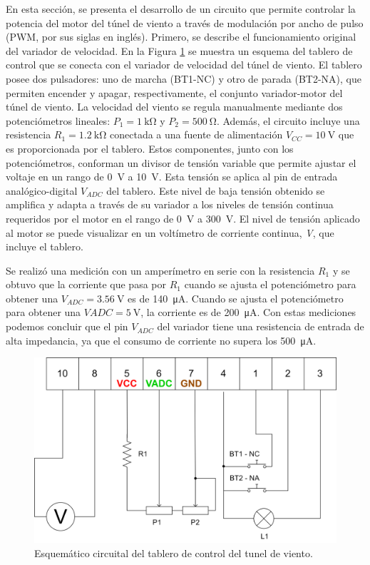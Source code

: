 En esta sección, se presenta el desarrollo de un circuito que permite controlar la potencia del motor del túnel de viento a través de modulación por ancho de pulso (PWM, por sus siglas en inglés). Primero, se describe el funcionamiento original del variador de velocidad. En la Figura \ref{fig:esquemCircuitoControlTunel} se muestra un esquema del tablero de control que se conecta con el variador de velocidad del túnel de viento. El tablero posee dos pulsadores: uno de marcha (BT1-NC) y otro de parada (BT2-NA), que permiten encender y apagar, respectivamente, el conjunto variador-motor del túnel de viento. La velocidad del viento se regula manualmente mediante dos potenciómetros lineales: $P_{1} = \SI{1}{\kilo\ohm}$ y $P_{2} = \SI{500}{\ohm}$. Además, el circuito incluye una resistencia $R_{1} = \SI{1.2}{\kilo\ohm}$ conectada a una fuente de alimentación $V_{CC} = \SI{10}{\volt}$ que es proporcionada por el tablero. Estos componentes, junto con los potenciómetros, conforman un divisor de tensión variable que permite ajustar el voltaje en un rango de \SI{0}{\volt} a \SI{10}{\volt}. Esta tensión se aplica al pin de entrada analógico-digital $V_{ADC}$ del tablero. Este nivel de baja tensión obtenido se amplifica y adapta a través de su variador a los niveles de tensión continua requeridos por el motor en el rango de \SI{0}{\volt} a \SI{300}{\volt}. El nivel de tensión aplicado al motor se puede visualizar en un voltímetro de corriente continua, \textit{V}, que incluye el tablero.

Se realizó una medición con un amperímetro en serie con la resistencia $R_{1}$ y se obtuvo que la corriente que pasa por $R_{1}$ cuando se ajusta el potenciómetro para obtener una $V_{ADC} = \SI{3.56}{\volt}$ es de \SI{140}{\micro\ampere}. Cuando se ajusta el potenciómetro para obtener una $VADC = \SI{5}{\volt}$, la corriente es de \SI{200}{\micro\ampere}. Con estas mediciones podemos concluir que el pin $V_{ADC}$ del variador tiene una resistencia de entrada de alta impedancia, ya que el consumo de corriente no supera los \SI{500}{\micro\ampere}.


\begin{figure}[H]
    \centering
    \includegraphics[width=0.85\linewidth]{Figuras/datalogger/Hardware/esquemCircuitoControlTunel.png}
    \caption{Esquemático circuital del tablero de control del tunel de viento.}
    \label{fig:esquemCircuitoControlTunel}
\end{figure}

